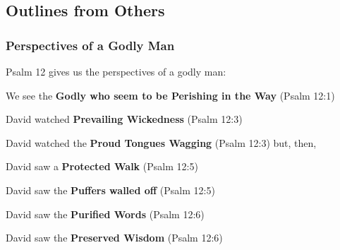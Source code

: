 \subsection{Outlines from Others}

\subsubsection{Perspectives of a Godly Man}
Psalm 12 gives us the perspectives of a godly man:
\begin{compactenum}[I.]
    \item We see the \textbf{Godly who seem to be Perishing in the Way}  (Psalm 12:1)
    \begin{compactenum}[A.]
    	\item David watched \textbf{Prevailing Wickedness}  (Psalm 12:3)
		\item David watched the \textbf{Proud Tongues Wagging}  (Psalm 12:3) \newline but, then, 
    \end{compactenum}	
    \item David saw a \textbf{Protected Walk}  (Psalm 12:5)
	\begin{compactenum}[A.]
    \item David saw the \textbf{Puffers walled off}  (Psalm 12:5)
    \item David saw the \textbf{Purified Words}  (Psalm 12:6)
    \item David saw the \textbf{Preserved Wisdom}  (Psalm 12:6)
    \end{compactenum}
\end{compactenum}





